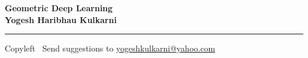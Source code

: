
\graphicspath{{images/}}

\footnotesize


\begin{center}
\Large{\textbf{Geometric Deep Learning\\ Yogesh Haribhau Kulkarni}}  
\end{center}

\begin{multicols}{2}

\end{multicols}

\rule{\linewidth}{0.25pt}
\scriptsize
Copyleft \textcopyleft\  Send suggestions to 
\href{http://www.yogeshkulkarni.com}{yogeshkulkarni@yahoo.com}


